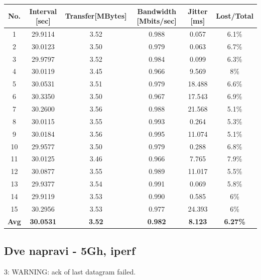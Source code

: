 \documentclass[11pt,a4paper,slovene]{article}
\begin{document}
\begin{table}[H]
	\begin{adjustwidth}{-3cm}{-3cm}
	\centering
		\begin{tabular}{c|c|c|c|c|c}
		\hline
		\textbf{No.} & \textbf{Interval [sec]} & \textbf{Transfer[MBytes]} & \textbf{Bandwidth [Mbits/sec]} & \textbf{Jitter [ms]} & \textbf{Lost/Total} \\
     		\hline
     		1 & 29.9114 & 3.52 & 0.988 & 0.057 & 6.1\% \\
  		2 & 30.0123 & 3.50 & 0.979 & 0.063 & 6.7\% \\
  		3 & 29.9797 & 3.52 & 0.984 & 0.099 & 6.3\% \\
  		4 & 30.0119 & 3.45 & 0.966 & 9.569 & 8\% \\
  		5 & 30.0531 & 3.51 & 0.979 & 18.488 & 6.6\% \\
  		6 & 30.3350 & 3.50 & 0.967 & 17.543 & 6.9\% \\
  		7 & 30.2600 & 3.56 & 0.988 & 21.568 & 5.1\% \\
  		8 & 30.0115 & 3.55 & 0.993 & 0.264 & 5.3\% \\
  		9 & 30.0184 & 3.56 & 0.995 & 11.074 & 5.1\% \\
  		10 & 29.9577 & 3.50 & 0.979 & 0.288 & 6.8\% \\
  		11 & 30.0125 & 3.46 & 0.966 & 7.765 & 7.9\% \\
  		12 & 30.0877 & 3.55 & 0.989 & 11.017 & 5.5\% \\
  		13 & 29.9377 & 3.54 & 0.991 & 0.069 & 5.8\% \\
  		14 & 29.9119 & 3.53 & 0.990 & 0.585 & 6\% \\
  		15 & 30.2956 & 3.53 & 0.977 & 24.393 & 6\% \\
  		\hline
  		\textbf{Avg} & \textbf{30.0531} & \textbf{3.52} & \textbf{0.982} & \textbf{8.123} & \textbf{6.27\%} \\
  		\hline
    		\end{tabular}
    	\end{adjustwidth}
\end{table}

\subsection{Dve napravi - 5Gh, iperf}

3: WARNING: ack of last datagram failed.
\end{document}
